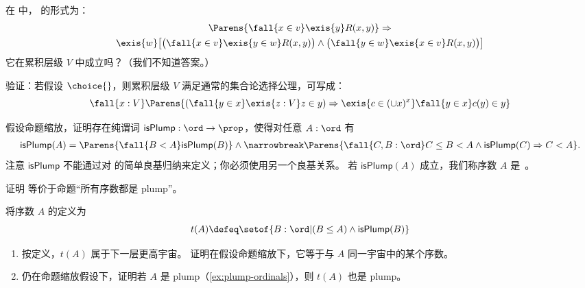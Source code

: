 \begin{ex}\label{ex:strong-collection}
  在 \CZF 中，
  的形式为：
   \begin{multline*}
   \Parens{\fall{x\in v}\exis{y} R(x,y)} \Rightarrow \\
   \exis{w}\big[\big(\fall{x\in v}\exis{y\in w}R(x,y)\big)\land \big(\fall{y\in w}\exis{x\in v}R(x,y) \big)\big]
   \end{multline*}
   它在累积层级 $V$ 中成立吗？（我们不知道答案。）
\end{ex}

\begin{ex}\label{ex:choice-cumulative-hierarchy-choice}
验证：若假设 $\choice{}$，则累积层级 $V$ 满足通常的集合论选择公理，可写成：
  \[
   \fall{x:V} \Parens{(\fall{y\in x}\exis{z:V} z\in y) \Rightarrow  \exis{c\in(\cup x)^x}\fall{y\in x} c(y)\in y}
   \]
\end{ex}

\begin{ex}\label{ex:plump-ordinals}
  假设命题缩放，证明存在纯谓词 $\mathsf{isPlump}:\ord\to\prop$，使得对任意 $A:\ord$ 有
  \begin{multline*}\label{eq:plump}
    \mathsf{isPlump}(A) = \Parens{\fall{B<A} \mathsf{isPlump}(B)} \wedge\narrowbreak
    \Parens{\fall{C,B:\ord} C\le B < A \wedge \mathsf{isPlump}(C) \Rightarrow C < A}.
  \end{multline*}
  注意 $\mathsf{isPlump}$ 不能通过对 \ord 的简单良基归纳来定义；你必须使用另一个良基关系。
  若 $\mathsf{isPlump}(A)$ 成立，我们称序数 $A$ 是~\cite{taylor:ordinals,Taylor99}。
\end{ex}

\begin{ex}\label{ex:not-plump}
  证明 \LEM{} 等价于命题“所有序数都是 plump”。
\end{ex}

\begin{ex}\label{ex:plump-successor}
  将序数 $A$ 的定义为
  \[ t(A) \defeq \setof{ B:\ord | (B\le A) \wedge \mathsf{isPlump}(B) } \]
  \begin{enumerate}
  \item 按定义，$t(A)$ 属于下一层更高宇宙。
    证明在假设命题缩放下，它等于与 $A$ 同一宇宙中的某个序数。
  \item 仍在命题缩放假设下，证明若 $A$ 是 plump（\cref{ex:plump-ordinals}），则 $t(A)$ 也是 plump。
  \end{enumerate}
\end{ex}

